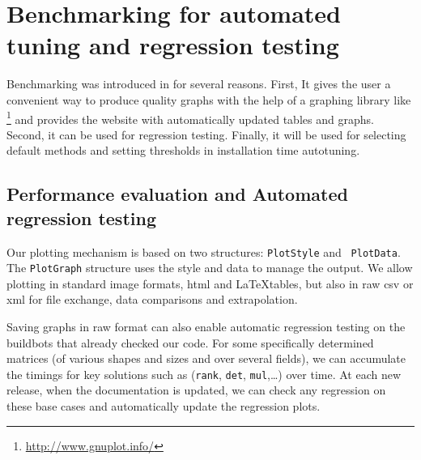 \section{Benchmarking  for automated tuning and regression testing}\label{sec:bench}
%
Benchmarking was introduced in \linbox for several reasons. First, It 
gives the user a convenient way to produce quality graphs with the
help  
of a graphing library like \gnuplot
\footnote{\url{http://www.gnuplot.info/}}
%
and provides the \linbox website with automatically updated tables and graphs.
Second, it can be used for regression testing.  Finally, it will be used for
selecting default methods and setting thresholds in installation time autotuning. %
%
\par
%
%
%
\subsection{Performance evaluation and Automated regression testing}
%
Our plotting mechanism is based on two structures: {\tt PlotStyle} and {\tt
PlotData}. The  {\tt PlotGraph} structure uses the style and data to manage the
output.  We allow plotting in standard image formats, html and \LaTeX tables,
but also in raw csv or xml for file exchange, data comparisons and
extrapolation. 
%
\par
%
% 
%
%
%
Saving graphs in raw format can also enable automatic regression testing on the
buildbots that already checked our code. For some specifically determined matrices (of
various shapes and sizes and over several fields), we can accumulate the timings
for key solutions such as ({\tt rank}, {\tt det}, {\tt mul},\ldots) over time.
At each new release, when the documentation is updated, we can check any
regression on these base cases and automatically update the regression plots.
%
